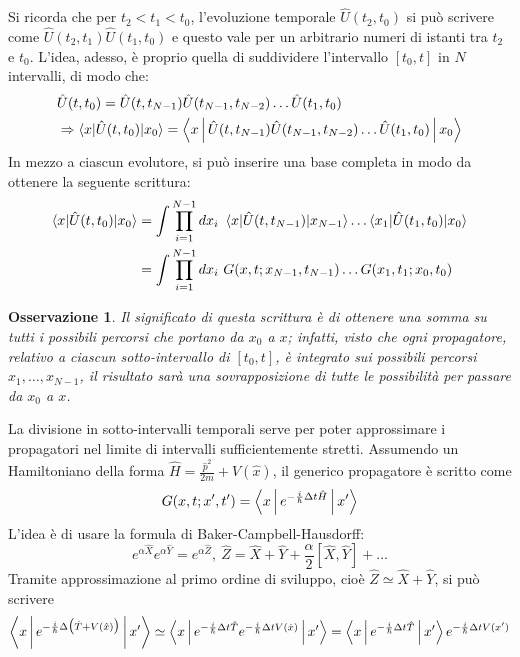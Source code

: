 \documentclass[11pt, a4paper]{scrartcl} %
\numberwithin{equation}{subsection}
\theoremstyle{style2}
\newtheorem{osservazione}{Osservazione}[section]
\theoremstyle{style1}
\begin{document}
Si ricorda che per $t_2<t_1<t_0$, l'evoluzione temporale $\hat{U}(t_2,t_0)$ si pu\`o scrivere come $\hat{U}(t_2,t_1) \hat{U}(t_{1},t_0)$ e questo vale per un arbitrario numeri di istanti tra $t_2$ e $t_0$.
L'idea, adesso, \`e proprio quella di suddividere l'intervallo $[t_0,t]$ in $N$ intervalli, di modo che:
\[
	\begin{split}
		&\hat{U}(t,t_0) = \hat{U}(t,t_{N-1} ) \hat{U}(t_{N-1} ,  t_{N-2} )  \ldots \hat{U}(t_1,t_0)\\
		&\Rightarrow \braket{x|\hat{U}(t,t_0)|x_0} = \Braket{x|\hat{U}(t,t_{N-1} ) \hat{U}(t_{N-1} ,  t_{N-2} )  \ldots \hat{U}(t_1,t_0)|x_0} 
	\end{split}
\] 
In mezzo a ciascun evolutore, si pu\`o inserire una base completa in modo da ottenere la seguente scrittura:
\begin{equation}
	\begin{split}
		\braket{x|\hat{U}(t,t_0)|x_0} &= \int \prod_{i=1} ^{N-1} dx_i \ \braket{x|\hat{U}(t,t_{N-1} )|x_{N-1} } \ldots \braket{x_1|\hat{U}(t_1,t_0)|x_0} \\
					      &= \int \prod _{i=1} ^{N-1} dx_i\   G(x,t;x_{N-1}, t_{N-1} ) \ldots G(x_1, t_1; x_0,t_0)
	\end{split}
\end{equation}
\begin{osservazione}
	Il significato di questa scrittura \`e di ottenere una somma su tutti i possibili percorsi che portano da $x_0$ a $x$; infatti, visto che ogni propagatore, relativo a ciascun sotto-intervallo di $[t_0,t]$, \`e integrato sui possibili percorsi $x_1,\ldots,x_{N-1} $, il risultato sar\`a una sovrapposizione di tutte le possibilit\`a per passare da $x_0$ a $x$.
\end{osservazione}
La divisione in sotto-intervalli temporali serve per poter approssimare i propagatori nel limite di intervalli sufficientemente stretti.
Assumendo un Hamiltoniano della forma $\hat{H} = \frac{\hat{p}^2}{2m} + V(\hat{x})$, il generico propagatore \`e scritto come
\[
G(x,t; x',t') =  \Braket{x |e^{-\frac{i}{\hbar }\Delta  t \hat{H}} |x'} 
\] 
L'idea \`e di usare la formula di Baker-Campbell-Hausdorff:
\[
	e^{\alpha  \hat{X}}  e^{\alpha  \hat{Y}}  = e^{\alpha  \hat{Z}} , \ \hat{Z} = \hat{X}+ \hat{Y} + \frac{\alpha }{2} [\hat{X},\hat{Y}] + \ldots
\] 
Tramite approssimazione al primo ordine di sviluppo, cio\`e $\hat{Z}\simeq \hat{X } + \hat{Y}$, si pu\`o scrivere 
\[
	\Braket{x|e^{-\frac{i}{\hbar }\Delta \big(\hat{T}+ V(\hat{x})\big)} |x'} \simeq \Braket{x|e^{-\frac{i}{\hbar }\Delta t \hat{T}} e^{-\frac{i}{\hbar }\Delta  t V(\hat{x})} |x'} =  \Braket{x|e^{-\frac{i}{\hbar }\Delta  t \hat{T}} |x'} e^{-\frac{i}{\hbar }\Delta  t V(x')} 
\] 
\end{document}
